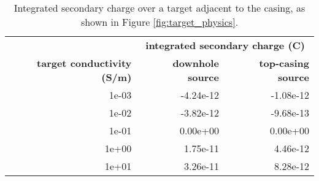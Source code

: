 \begin{table}
\centering
    \caption{Integrated secondary charge over a target adjacent to the casing, as shown in Figure \ref{fig:target_physics}.}
    \begin{tabular}[htb]{| r | r | r |}
        \hline
                                           & \multicolumn{2}{|c|}{\textbf{integrated secondary charge (C)}} \\
        \textbf{target conductivity (S/m)} & \textbf{downhole source} & \textbf{top-casing source} \\
        \hline
        1e-03 & -4.24e-12 & -1.08e-12 \\
        1e-02 & -3.82e-12 & -9.68e-13 \\
        1e-01 & 0.00e+00 & 0.00e+00 \\
        1e+00 & 1.75e-11 & 4.46e-12 \\
        1e+01 & 3.26e-11 & 8.28e-12 \\
        \hline
    \end{tabular}
    \label{tab:target_charge}
 \end{table}
